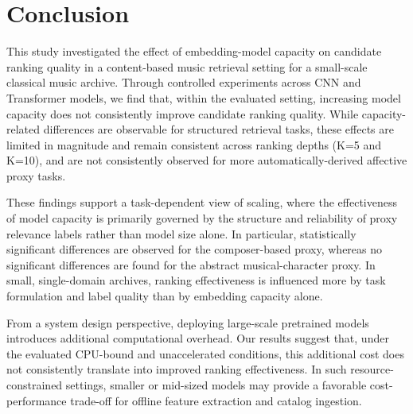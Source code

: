 \documentclass[sigconf]{acmart}
\begin{document}
\section{Conclusion}

This study investigated the effect of embedding-model capacity on candidate ranking quality in a content-based music retrieval setting for a small-scale classical music archive. Through controlled experiments across CNN and Transformer models, we find that, within the evaluated setting, increasing model capacity does not consistently improve candidate ranking quality. While capacity-related differences are observable for structured retrieval tasks, these effects are limited in magnitude and remain consistent across ranking depths (K=5 and K=10), and are not consistently observed for more automatically-derived affective proxy tasks.

These findings support a task-dependent view of scaling, where the effectiveness of model capacity is primarily governed by the structure and reliability of proxy relevance labels rather than model size alone. In particular, statistically significant differences are observed for the composer-based proxy, whereas no significant differences are found for the abstract musical-character proxy. In small, single-domain archives, ranking effectiveness is influenced more by task formulation and label quality than by embedding capacity alone.

From a system design perspective, deploying large-scale pretrained models introduces additional computational overhead. Our results suggest that, under the evaluated CPU-bound and unaccelerated conditions, this additional cost does not consistently translate into improved ranking effectiveness. In such resource-constrained settings, smaller or mid-sized models may provide a favorable cost-performance trade-off for offline feature extraction and catalog ingestion.


\end{document}

